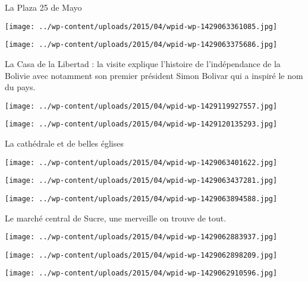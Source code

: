  \newline
 La Plaza 25 de Mayo \newline
 \newline
\centerline{\texttt{[image: ../wp-content/uploads/2015/04/wpid-wp-1429063361085.jpg]} } 
 \newline
 \newline
\centerline{\texttt{[image: ../wp-content/uploads/2015/04/wpid-wp-1429063375686.jpg]} } 
 \newline
 La Casa de la Libertad : la visite explique l'histoire de l'indépendance de la Bolivie avec notamment son premier président Simon Bolivar qui a inspiré le nom du pays.  \newline
 \newline
\centerline{\texttt{[image: ../wp-content/uploads/2015/04/wpid-wp-1429119927557.jpg]} } 
 \newline
 \newline
\centerline{\texttt{[image: ../wp-content/uploads/2015/04/wpid-wp-1429120135293.jpg]} } 
 \newline
 La cathédrale et de belles églises \newline
 \newline
\centerline{\texttt{[image: ../wp-content/uploads/2015/04/wpid-wp-1429063401622.jpg]} } 
 \newline
 \newline
\centerline{\texttt{[image: ../wp-content/uploads/2015/04/wpid-wp-1429063437281.jpg]} } 
 \newline
 \newline
\centerline{\texttt{[image: ../wp-content/uploads/2015/04/wpid-wp-1429063894588.jpg]} } 
 \newline
 Le marché central de Sucre, une merveille on trouve de tout.  \newline
 \newline
\centerline{\texttt{[image: ../wp-content/uploads/2015/04/wpid-wp-1429062883937.jpg]} } 
 \newline
 \newline
\centerline{\texttt{[image: ../wp-content/uploads/2015/04/wpid-wp-1429062898209.jpg]} } 
 \newline
 \newline
\centerline{\texttt{[image: ../wp-content/uploads/2015/04/wpid-wp-1429062910596.jpg]} } 
 \newline
 \newline
